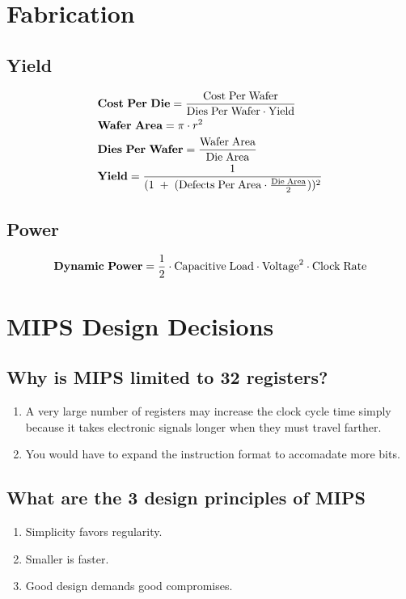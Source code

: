 \documentclass[12pt]{article}
\begin{document}
\section{Fabrication}

\subsection*{Yield}
\begin{align*}
	&\mathrm{\textbf{Cost\;Per\;Die}} = \frac{\mathrm{Cost\;Per\;Wafer}}{\mathrm{Dies\;Per\;Wafer}\cdot{\mathrm{Yield}}}\\
	&\mathrm{\textbf{Wafer\;Area}} = \pi\cdot{r}^2\\
	&\mathrm{\textbf{Dies\;Per\;Wafer}} = \frac{\mathrm{Wafer\;Area}}{\mathrm{Die\;Area}}\\
	&\mathrm{\textbf{Yield}} = \frac{1}{(1\;+\;(\mathrm{Defects\;Per\;Area\cdot{\frac{\mathrm{Die\;Area}}{2}}}))^2}\\
\end{align*}

\subsection*{Power}
\begin{align*}
	\mathrm{\textbf{Dynamic\;Power}} = \frac{1}{2}\cdot{\mathrm{Capacitive\;Load}}\cdot{\mathrm{Voltage}^2}\cdot{\mathrm{Clock\;Rate}} 
\end{align*}

\section{MIPS Design Decisions}

\subsection*{Why is MIPS limited to 32 registers?}
\begin{enumerate}
\item{A very large number of registers may increase the clock cycle time simply because it takes electronic signals longer when they must travel farther.}
\item{You would have to expand the instruction format to accomadate more bits.}
\end{enumerate}

\subsection*{What are the 3 design principles of MIPS}
\begin{enumerate}
	\item{Simplicity favors regularity.}
	\item{Smaller is faster.}
	\item{Good design demands good compromises.}
\end{enumerate}
\end{document}
